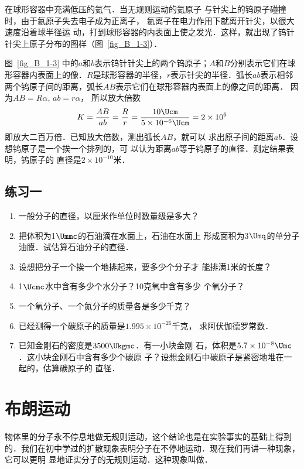     在球形容器中充满低压的氦气．当无规则运动的氦原子
与针尖上的钨原子碰撞时，由于氦原子失去电子成为正离子，
氦离子在电力作用下就离开针尖，以很大速度沿着球半径运
动，打到球形容器的内表面上使之发光．这样，就出现了钨针
针尖上原子分布的图样（图~\ref{fig_B_1-3}）．


图~\ref{fig_B_1-3} 中的$a$和$b$表示钨针针尖上的两个钨原子；$A$和$B$分别表示它们在球形容器内表面上的像．$R$是球形容器的半径，$r$表示针尖的半径．弧长$ab$表示相邻两个钨原子间的距离，弧长$AB$表示它们在球形容器内表面上的像之间的距离．
因为$AB=R\alpha$, $ab=r\alpha$，
所以放大倍数
\[K=\frac{AB}{ab}=\frac{R}{r}=\frac{10 \Ucm }{5\times 10^{-6} \Ucm }=2\times 10^6 \]
即放大二百万倍．已知放大倍数，测出弧长$AB$，就可以
求出原子间的距离$ab$．设想钨原子是一个挨一个排列的，可
以认为距离$ab$等于钨原子的直径．测定结果表明，钨原子的
直径是$2\times 10^{-10}$米．


\subsection*{练习一}
\begin{enumerate}
\item  一般分子的直径，以厘米作单位时数量级是多大？
\item  把体积为1$\Ummc$的石油滴在水面上，石油在水面上
形成面积为3$\Umq$的单分子油膜．试估算石油分子的直径．
\item  设想把分子一个挨一个地排起来，要多少个分子才
能排满1米的长度？
\item  1$\Ucmc$水中含有多少个水分子？10克氧中含有多少
个氧分子？
\item  一个氧分子、一个氮分子的质量各是多少千克？
\item  已经测得一个碳原子的质量是$1.995\times 10^{-26}$千克，
求阿伏伽德罗常数．
\item  已知金刚石的密度是$3500 \Ukgmc$．有一小块金刚
石，体积是$5.7\times 10^{-8} \Umc $．这小块金刚石中含有多少个碳原
子？设想金刚石中碳原子是紧密地堆在一起的，估算碳原子的
直径．

\end{enumerate}







\section{布朗运动}
物体里的分子永不停息地做无规则运动，这个结论也是在实验事实的基础上得到的．我们在初中学过的扩散现象表明分子在不停地运动．现在我们再讲一种现象，它可以更明
显地证实分子的无规则运动．这种现象叫做．


